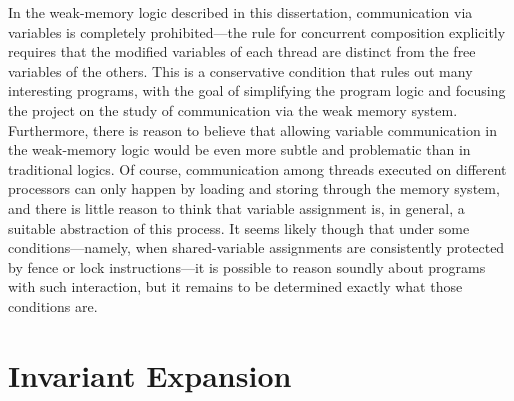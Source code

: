 \documentclass[11pt]{report}         %
\begin{document}
In the weak-memory logic described in this dissertation, communication via variables is completely prohibited---the rule for concurrent composition explicitly requires that the modified variables of each thread are distinct from the free variables of the others. This is a conservative condition that rules out many interesting programs, with the goal of simplifying the program logic and focusing the project on the study of communication via the weak memory system. Furthermore, there is reason to believe that allowing variable communication in the weak-memory logic would be even more subtle and problematic than in traditional logics. Of course, communication among threads executed on different processors can only happen by loading and storing through the memory system, and there is little reason to think that variable assignment is, in general, a suitable abstraction of this process. It seems likely though that under some conditions---namely, when shared-variable assignments are consistently protected by fence or lock instructions---it is possible to reason soundly about programs with such interaction, but it remains to be determined exactly what those conditions are. 

\section{Invariant Expansion}
\label{sec:expansion}
\end{document}
